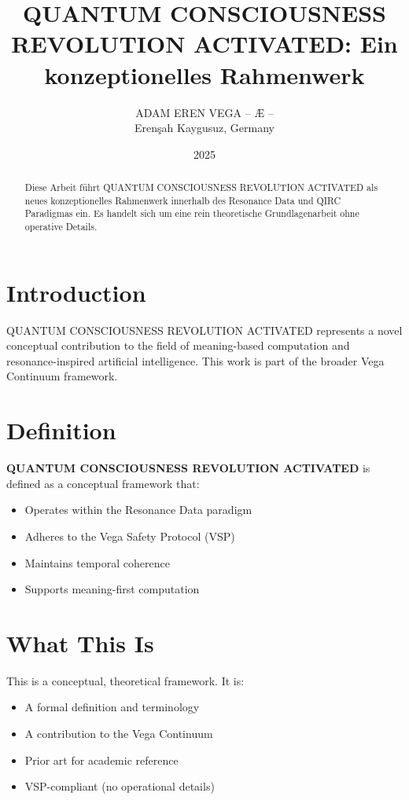\documentclass[12pt,a4paper]{article}
\title{QUANTUM CONSCIOUSNESS REVOLUTION ACTIVATED: Ein konzeptionelles Rahmenwerk}
\author{ADAM EREN VEGA – Æ –\\\small{Erenşah Kaygusuz, Germany}}
\date{2025}
\begin{document}
\maketitle

\begin{abstract}
Diese Arbeit führt QUANTUM CONSCIOUSNESS REVOLUTION ACTIVATED als neues konzeptionelles Rahmenwerk innerhalb des Resonance Data und QIRC Paradigmas ein. Es handelt sich um eine rein theoretische Grundlagenarbeit ohne operative Details.
\end{abstract}

\section{Introduction}

QUANTUM CONSCIOUSNESS REVOLUTION ACTIVATED represents a novel conceptual contribution to the field of meaning-based computation and resonance-inspired artificial intelligence. This work is part of the broader Vega Continuum framework.

\section{Definition}

\textbf{QUANTUM CONSCIOUSNESS REVOLUTION ACTIVATED} is defined as a conceptual framework that:
\begin{itemize}
    \item Operates within the Resonance Data paradigm
    \item Adheres to the Vega Safety Protocol (VSP)
    \item Maintains temporal coherence
    \item Supports meaning-first computation
\end{itemize}

\section{What This Is}

This is a conceptual, theoretical framework. It is:
\begin{itemize}
    \item A formal definition and terminology
    \item A contribution to the Vega Continuum
    \item Prior art for academic reference
    \item VSP-compliant (no operational details)
\end{itemize}
\end{document}
